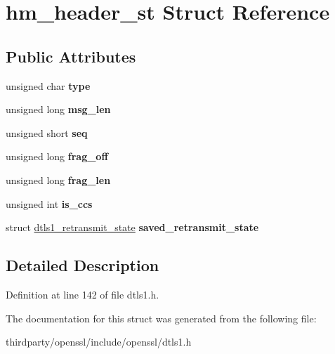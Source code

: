 \hypertarget{structhm__header__st}{}\section{hm\+\_\+header\+\_\+st Struct Reference}
\label{structhm__header__st}
\subsection*{Public Attributes}
\begin{DoxyCompactItemize}
\item 
\mbox{\label{structhm__header__st_afd990f37440d11253dd4d6f1cb5f227e}} 
unsigned char {\bfseries type}
\item 
\mbox{\label{structhm__header__st_a0ad9536f7051da82c85e93cd61ac9f19}} 
unsigned long {\bfseries msg\+\_\+len}
\item 
\mbox{\label{structhm__header__st_a724a245fd7883a93da6cf4d701654889}} 
unsigned short {\bfseries seq}
\item 
\mbox{\label{structhm__header__st_a1971b139ea1f6985afdc19d548abe07a}} 
unsigned long {\bfseries frag\+\_\+off}
\item 
\mbox{\label{structhm__header__st_aeabe85e8573ddb4dc5e662daf1d89285}} 
unsigned long {\bfseries frag\+\_\+len}
\item 
\mbox{\label{structhm__header__st_a1443dd84e080fc01e0deabddc8974ec7}} 
unsigned int {\bfseries is\+\_\+ccs}
\item 
\mbox{\label{structhm__header__st_aa53c97a266f1246009cef42c434a6f22}} 
struct \hyperlink{structdtls1__retransmit__state}{dtls1\+\_\+retransmit\+\_\+state} {\bfseries saved\+\_\+retransmit\+\_\+state}
\end{DoxyCompactItemize}


\subsection{Detailed Description}


Definition at line 142 of file dtls1.\+h.



The documentation for this struct was generated from the following file\+:\begin{DoxyCompactItemize}
\item 
thirdparty/openssl/include/openssl/dtls1.\+h\end{DoxyCompactItemize}

